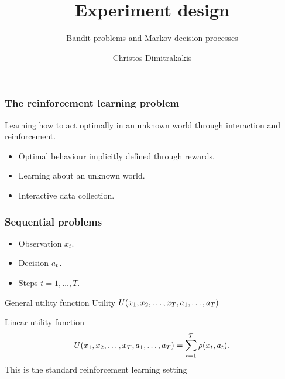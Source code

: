 \documentclass[9pt]{beamer}
\title{Experiment design}
\subtitle{Bandit problems and Markov decision processes}
\author{Christos Dimitrakakis}
\institute{Chalmers}
\begin{document}
\begin{frame}
  \titlepage
\end{frame}

\begin{frame}
  \tableofcontents
\end{frame}

\begin{frame}
  \frametitle{The reinforcement learning problem}
  \alert{Learning} how to \alert{act optimally} in an \alert{unknown world} through \alert{interaction} and \alert{reinforcement}.

  \begin{itemize}
  \item Optimal behaviour implicitly defined through rewards.
  \item Learning about an unknown world.
  \item Interactive data collection.
  \end{itemize}
\end{frame}


\begin{frame}
  \frametitle{Sequential problems}
  \begin{itemize}
  \item Observation $x_t$.
  \item Decision $a_t$.
  \item Steps $t = 1, \ldots, T$.
  \end{itemize}

  \begin{block}{General utility function}
    Utility $U(x_1, x_2, \ldots, x_T, a_1, \ldots, a_T)$
  \end{block}

  \begin{block}{Linear utility function}
    \[
      U(x_1, x_2, \ldots, x_T, a_1, \ldots, a_T)
      = 
      \sum_{t=1}^T \rho(x_t, a_t).
    \]
    \alert{This is the standard reinforcement learning setting}
  \end{block}
\end{frame}
\end{document}
